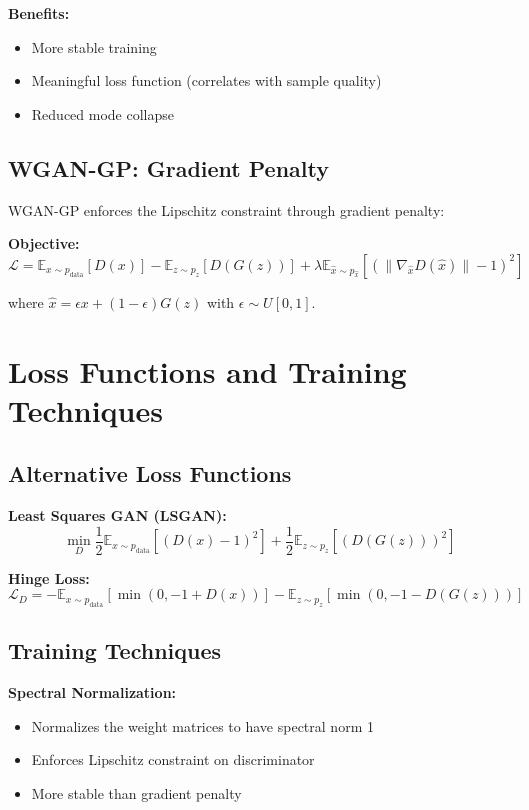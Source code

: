 \textbf{Benefits:}
\begin{itemize}
    \item More stable training
    \item Meaningful loss function (correlates with sample quality)
    \item Reduced mode collapse
\end{itemize}

\subsection{WGAN-GP: Gradient Penalty}

WGAN-GP enforces the Lipschitz constraint through gradient penalty:

\textbf{Objective:}
\begin{equation}
    \mathcal{L} = \mathbb{E}_{x \sim p_{\text{data}}}[D(x)] - \mathbb{E}_{z \sim p_z}[D(G(z))] + \lambda \mathbb{E}_{\hat{x} \sim p_{\hat{x}}}[(\|\nabla_{\hat{x}} D(\hat{x})\| - 1)^2]
\end{equation}

where $\hat{x} = \epsilon x + (1-\epsilon) G(z)$ with $\epsilon \sim U[0,1]$.

\section{Loss Functions and Training Techniques}

\subsection{Alternative Loss Functions}

\textbf{Least Squares GAN (LSGAN):}
\begin{equation}
    \min_D \frac{1}{2}\mathbb{E}_{x \sim p_{\text{data}}}[(D(x) - 1)^2] + \frac{1}{2}\mathbb{E}_{z \sim p_z}[(D(G(z)))^2]
\end{equation}

\textbf{Hinge Loss:}
\begin{equation}
    \mathcal{L}_D = -\mathbb{E}_{x \sim p_{\text{data}}}[\min(0, -1 + D(x))] - \mathbb{E}_{z \sim p_z}[\min(0, -1 - D(G(z)))]
\end{equation}

\subsection{Training Techniques}

\textbf{Spectral Normalization:}
\begin{itemize}
    \item Normalizes the weight matrices to have spectral norm 1
    \item Enforces Lipschitz constraint on discriminator
    \item More stable than gradient penalty
\end{itemize}

